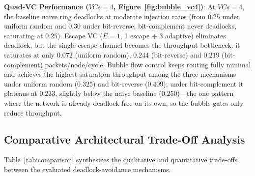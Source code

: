 \documentclass[10pt,journal,compsoc]{IEEEtran}
\begin{document}
\textbf{Quad-VC Performance ($VCs=4$, Figure~\ref{fig:bubble_vc4})}:
At $VCs=4$, the baseline naive ring deadlocks at moderate injection rates (from $0.25$ under uniform random and $0.30$ under bit-reverse; bit-complement never deadlocks, saturating at $0.25$). Escape VC ($E=1$, 1 escape + 3 adaptive) eliminates deadlock, but the single escape channel becomes the throughput bottleneck: it saturates at only $0.072$ (uniform random), $0.244$ (bit-reverse) and $0.219$ (bit-complement) packets/node/cycle. Bubble flow control keeps routing fully minimal and achieves the highest saturation throughput among the three mechanisms under uniform random ($0.325$) and bit-reverse ($0.409$); under bit-complement it plateaus at $0.233$, slightly below the naive baseline ($0.250$)---the one pattern where the network is already deadlock-free on its own, so the bubble gates only reduce throughput.

\subsection{Comparative Architectural Trade-Off Analysis}
Table~\ref{tab:comparison} synthesizes the qualitative and quantitative trade-offs between the evaluated deadlock-avoidance mechanisms.
\end{document}
